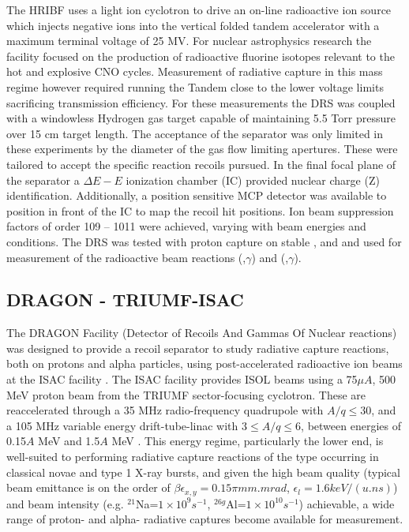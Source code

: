 The HRIBF uses a light ion cyclotron to drive an on-line radioactive ion source which injects negative ions into the vertical folded tandem accelerator with a maximum terminal voltage of 25 MV. For nuclear astrophysics research the facility focused on the production of radioactive fluorine isotopes relevant to the hot and explosive CNO cycles. Measurement of radiative capture in this mass regime however required running the Tandem close to the lower voltage limits sacrificing transmission efficiency. For these measurements the DRS was coupled with a windowless Hydrogen gas target capable of maintaining 5.5 Torr pressure over 15 cm target length. The acceptance of the separator was only limited in these experiments by the diameter of the gas flow limiting apertures. These were tailored to accept the specific reaction recoils pursued. In the final focal plane of the separator a $\Delta{}E-E$ ionization chamber (IC) provided nuclear charge (Z) identification. Additionally, a position sensitive MCP detector was available to position in front of the IC to map the recoil hit positions. Ion beam suppression factors of order 109 -- 1011 were achieved, varying with beam energies and conditions. The DRS was tested with proton capture on stable ,  and  and used for measurement of the radioactive beam reactions (,$\gamma$) and (,$\gamma$). 


\subsection{DRAGON - TRIUMF-ISAC}
The DRAGON Facility (Detector of Recoils And Gammas Of Nuclear reactions) was designed to provide a recoil separator to study radiative capture reactions, both on protons and alpha particles, using post-accelerated radioactive ion beams at the ISAC facility \cite{hut03a,hut03,eng05}. The ISAC facility \cite{ball11} provides ISOL beams using a 75$\mu A$, 500 MeV proton beam from the TRIUMF sector-focusing cyclotron. These are reaccelerated through a 35 MHz radio-frequency quadrupole with $A/q\leq30$, and a 105 MHz variable energy drift-tube-linac with $3\leq A/q\leq6$, between energies of 0.15$A$ MeV and 1.5$A$ MeV \cite{lax02}.  This energy regime, particularly the lower end, is well-suited to performing radiative capture reactions of the type occurring in classical novae and type 1 X-ray bursts, and given the high beam quality (typical beam emittance is on the order of  $\beta\epsilon_{x,y}=0.15\pi mm.mrad$, $\epsilon_{l}=1.6keV/(u.ns)$) and beam intensity (e.g. $^{21}$Na=$1\times10^{9} s^{-1}$, $^{26g}$Al=$1\times10^{10}s^{-1}$) achievable, a wide range of proton- and alpha- radiative captures become available for measurement. 

